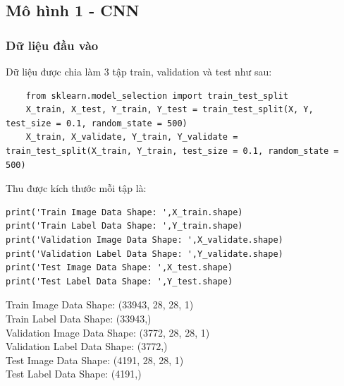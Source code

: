\subsection{Mô hình 1 - CNN}
\subsubsection{Dữ liệu đầu vào}
Dữ liệu được chia làm 3 tập train, validation và test như sau:
\begin{lstlisting}
    from sklearn.model_selection import train_test_split
    X_train, X_test, Y_train, Y_test = train_test_split(X, Y, test_size = 0.1, random_state = 500)
    X_train, X_validate, Y_train, Y_validate = train_test_split(X_train, Y_train, test_size = 0.1, random_state = 500)
\end{lstlisting}
Thu được kích thước mỗi tập là:\\
\begin{lstlisting}
print('Train Image Data Shape: ',X_train.shape)
print('Train Label Data Shape: ',Y_train.shape)
print('Validation Image Data Shape: ',X_validate.shape)
print('Validation Label Data Shape: ',Y_validate.shape)
print('Test Image Data Shape: ',X_test.shape)
print('Test Label Data Shape: ',Y_test.shape)
\end{lstlisting}
Train Image Data Shape:  (33943, 28, 28, 1)\\
Train Label Data Shape:  (33943,)\\
Validation Image Data Shape:  (3772, 28, 28, 1)\\
Validation Label Data Shape:  (3772,)\\
Test Image Data Shape:  (4191, 28, 28, 1)\\
Test Label Data Shape:  (4191,)
